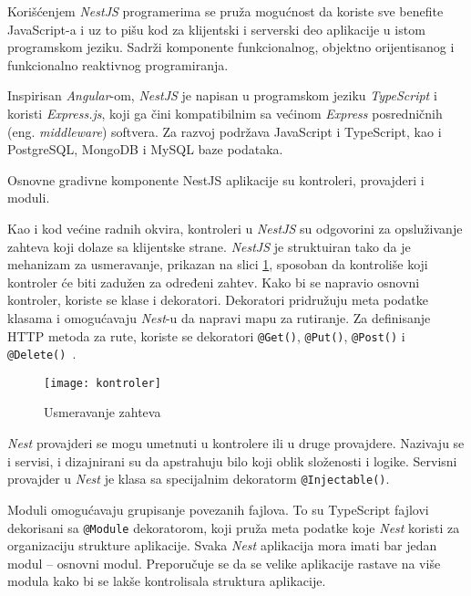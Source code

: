 Korišćenjem \textit{NestJS} programerima se pruža mogućnost da koriste sve benefite JavaScript-a i uz
to pišu kod za klijentski i serverski deo aplikacije u istom programskom jeziku. Sadrži komponente 
funkcionalnog, objektno orijentisanog i funkcionalno reaktivnog programiranja.

Inspirisan \textit{Angular}-om, \textit{NestJS} je napisan u programskom jeziku \textit{TypeScript} 
i koristi \textit{Express.js}, koji ga čini kompatibilnim sa većinom \textit{Express} posredničnih 
(eng. \textit{middleware}) softvera. Za razvoj podržava JavaScript i TypeScript, kao i PostgreSQL, 
MongoDB i MySQL baze podataka.

Osnovne gradivne komponente NestJS aplikacije su kontroleri, provajderi i moduli.

Kao i kod većine radnih okvira, kontroleri u \textit{NestJS} su odgovorini za opsluživanje zahteva koji dolaze
sa klijentske strane. \textit{NestJS} je struktuiran tako da je
mehanizam za usmeravanje, prikazan na slici \ref{fig:kontroler}, sposoban da kontroliše koji kontroler 
će biti zadužen za određeni zahtev.
Kako bi se napravio osnovni kontroler, koriste se klase i dekoratori. Dekoratori pridružuju meta
podatke klasama i omogućavaju \textit{Nest}-u da napravi mapu za rutiranje. Za definisanje HTTP 
metoda za rute, koriste se dekoratori \texttt{@Get()}, \texttt{@Put()}, \texttt{@Post()} i \texttt{@Delete()}~\cite{nest}.

\begin{figure}[h]
    \centering
    \texttt{[image: kontroler]}
    \caption{Usmeravanje zahteva}
    \label{fig:kontroler}
\end{figure}
  
\textit{Nest} provajderi se mogu umetnuti u kontrolere ili u druge provajdere. Nazivaju se i servisi, 
i dizajnirani su da apstrahuju bilo koji oblik složenosti i logike.
Servisni provajder u \textit{Nest} je klasa sa specijalnim dekoratorm \texttt{@Injectable()}. 

Moduli omogućavaju grupisanje povezanih fajlova. To su TypeScript fajlovi dekorisani sa 
\texttt{@Module} dekoratorom, koji pruža meta podatke koje \textit{Nest} koristi za organizaciju 
strukture aplikacije. Svaka \textit{Nest} aplikacija mora imati bar jedan modul -- osnovni modul. 
Preporučuje se da se velike aplikacije rastave na više modula kako bi se lakše kontrolisala 
struktura aplikacije.

